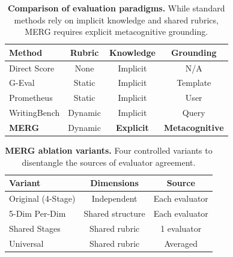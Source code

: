 \documentclass{article}
\begin{document}
\begin{table}[t]
\centering
\caption{\textbf{Comparison of evaluation paradigms.} While standard methods rely on implicit knowledge and shared rubrics, MERG requires explicit metacognitive grounding.}
\label{tab:comparison}
\small
\begin{tabular}{lccc}
\toprule
\textbf{Method} & \textbf{Rubric} & \textbf{Knowledge} & \textbf{Grounding} \\
\midrule
Direct Score & None & Implicit & N/A \\
G-Eval & Static & Implicit & Template \\
Prometheus & Static & Implicit & User \\
WritingBench & Dynamic & Implicit & Query \\
\textbf{MERG} & Dynamic & \textbf{Explicit} & \textbf{Metacognitive} \\
\bottomrule
\end{tabular}
\end{table}

\begin{table}[t]
\centering
\caption{\textbf{MERG ablation variants.} Four controlled variants to disentangle the sources of evaluator agreement.}
\label{tab:ablation_variants}
\small
\begin{tabular}{lcc}
\toprule
\textbf{Variant} & \textbf{Dimensions} & \textbf{Source} \\
\midrule
Original (4-Stage) & Independent & Each evaluator \\
5-Dim Per-Dim & Shared structure & Each evaluator \\
Shared Stages & Shared rubric & 1 evaluator \\
Universal & Shared rubric & Averaged \\
\bottomrule
\end{tabular}
\end{table}
\end{document}
